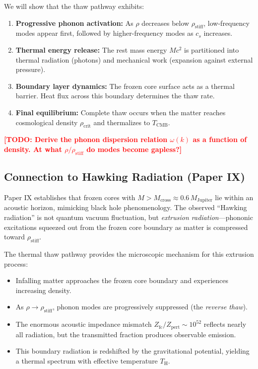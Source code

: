 \documentclass[11pt,a4paper]{article}
\newcommand{\rhocrit}{\ensuremath{\rho_{\mathrm{crit}}}}
\newcommand{\rhostiff}{\ensuremath{\rho_{\mathrm{stiff}}}}
\newcommand{\cs}{\ensuremath{c_s}}
\newcommand{\TCMB}{\ensuremath{T_{\mathrm{CMB}}}}
\newcommand{\Mcross}{\ensuremath{M_{\mathrm{cross}}}}
\newcommand{\Zfc}{\ensuremath{Z_{\mathrm{fc}}}}
\newcommand{\Zpert}{\ensuremath{Z_{\mathrm{pert}}}}
\newcommand{\TH}{\ensuremath{T_{\mathrm{H}}}}
\newcommand{\TODO}[1]{\textcolor{red}{\textbf{[TODO: #1]}}}
\theoremstyle{definition}
\theoremstyle{remark}
\begin{document}
\vspace{0.5em}
\noindent
We will show that the thaw pathway exhibits:
\begin{enumerate}[leftmargin=*, itemsep=0.3em]
\item \textbf{Progressive phonon activation:} As $\rho$ decreases below $\rhostiff$, low-frequency modes appear first, followed by higher-frequency modes as $\cs$ increases.
\item \textbf{Thermal energy release:} The rest mass energy $Mc^2$ is partitioned into thermal radiation (photons) and mechanical work (expansion against external pressure).
\item \textbf{Boundary layer dynamics:} The frozen core surface acts as a thermal barrier. Heat flux across this boundary determines the thaw rate.
\item \textbf{Final equilibrium:} Complete thaw occurs when the matter reaches cosmological density $\rhocrit$ and thermalizes to $\TCMB$.
\end{enumerate}

\TODO{Derive the phonon dispersion relation $\omega(k)$ as a function of density. At what $\rho/\rhostiff$ do modes become gapless?}

\subsection{Connection to Hawking Radiation (Paper IX)}
\label{sec:connection_hawking}

Paper IX establishes that frozen cores with $M > \Mcross \approx 0.6\, M_{\mathrm{Jupiter}}$ lie within an acoustic horizon, mimicking black hole phenomenology. The observed ``Hawking radiation'' is not quantum vacuum fluctuation, but \emph{extrusion radiation}---phononic excitations squeezed out from the frozen core boundary as matter is compressed toward $\rhostiff$.

\vspace{0.5em}
\noindent
The thermal thaw pathway provides the microscopic mechanism for this extrusion process:
\begin{itemize}[leftmargin=*, itemsep=0.3em]
\item Infalling matter approaches the frozen core boundary and experiences increasing density.
\item As $\rho \to \rhostiff$, phonon modes are progressively suppressed (the \emph{reverse thaw}).
\item The enormous acoustic impedance mismatch $\Zfc/\Zpert \sim 10^{52}$ reflects nearly all radiation, but the transmitted fraction produces observable emission.
\item This boundary radiation is redshifted by the gravitational potential, yielding a thermal spectrum with effective temperature $\TH$.
\end{itemize}
\end{document}
